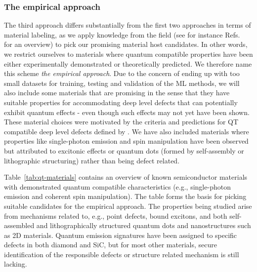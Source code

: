\documentclass[superscriptaddress,unsortedaddress,
 amsmath,amssymb,
 aps,
]{revtex4-2}
\begin{document}
% 


\subsubsection*{The empirical approach}
The third approach differs substantially from the first two approaches in terms of material labeling, as we apply knowledge from the field (see for instance Refs.~\cite{Atatuere2018,Zhang2020,Son2020,Toth2019,Bathen2021} for an overview) to pick our promising material host candidates.  
In other words, we restrict ourselves to materials where quantum compatible properties have been either experimentally demonstrated or theoretically predicted. 
We therefore name this scheme \emph{the empirical approach}. Due to the concern of ending up with too small datasets for training, testing and validation of the ML methods, we will also include some  materials that are promising in the sense that they have suitable properties for accommodating deep level defects that can potentially exhibit quantum effects - even though such effects may not yet have been shown. These material choices were motivated by the criteria and predictions for QT compatible deep level defects defined by \citeauthor{Weber2010} \cite{Weber2010}. 
We have also included materials where properties like single-photon emission and spin manipulation have been observed but attributed to excitonic effects or quantum dots (formed by self-assembly or lithographic structuring) rather than being defect related.


Table~\ref{tab:qt-materials} contains an overview of known semiconductor materials with demonstrated quantum compatible characteristics (e.g., single-photon emission and coherent spin manipulation). The table forms the basis for picking suitable candidates for the empirical approach. The properties being studied arise from mechanisms related to, e.g., point defects, bound excitons, and both self-assembled and lithographically structured quantum dots and  nanostructures such as 2D materials. 
Quantum emission signatures have been assigned to specific defects in both diamond and SiC, but for most other materials, secure identification of the responsible defects or structure related mechanism is still lacking.  
\end{document}
